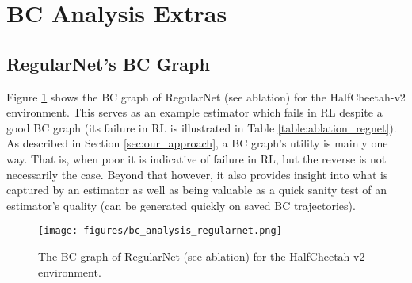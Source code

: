 \section{BC Analysis Extras}

\subsection{RegularNet's BC Graph}\label{section:appendix_regular_net_bc}

Figure \ref{fig:regularnet_bc} shows the BC graph of RegularNet (see ablation) for the HalfCheetah-v2 environment. This serves as an example estimator which fails in RL despite a good BC graph (its failure in RL is illustrated in Table \ref{table:ablation_regnet}). As described in Section \ref{sec:our_approach}, a BC graph's utility is mainly one way. That is, when poor it is indicative of failure in RL, but the reverse is not necessarily the case. Beyond that however, it also provides insight into what is captured by an estimator as well as being valuable as a quick sanity test of an estimator’s quality (can be generated quickly on saved BC trajectories). 

\begin{figure}[h!]
\vskip 0.1in
\centering
\texttt{[image: figures/bc\_analysis\_regularnet.png]} %
\caption{The BC graph of RegularNet (see ablation) for the HalfCheetah-v2 environment.}
\label{fig:regularnet_bc}
\vskip -0.1in
\end{figure} 

